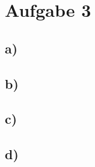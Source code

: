 \documentclass[11pt,a4paper,parskip=half ]{scrartcl}
\begin{document}
	
	\section*{Aufgabe 3}
	
	\subsection*{a)}
	
	\subsection*{b)}
	
	\subsection*{c)}
	
	\subsection*{d)}
	
\end{document}
